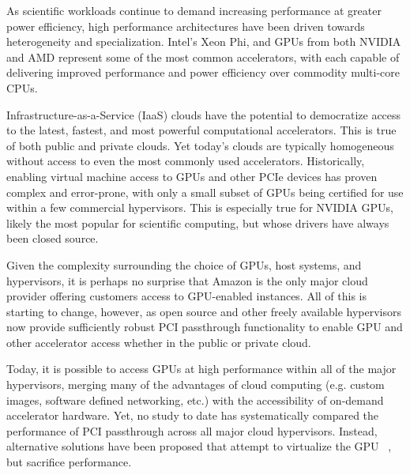 

As scientific workloads continue to demand increasing performance at greater
power efficiency, high performance architectures have been driven towards heterogeneity and
specialization.  Intel's Xeon Phi, and GPUs from both NVIDIA and AMD represent some
of the most common accelerators, with each capable of delivering improved
performance and power efficiency over commodity multi-core CPUs. 




 Infrastructure-as-a-Service (IaaS) clouds have the potential to
democratize access to the latest, fastest, and most powerful computational
accelerators.  This is true of both public and private clouds.  Yet today's
clouds are typically homogeneous without access to even the most commonly used
accelerators.  Historically, enabling virtual machine access to GPUs and other PCIe devices has
proven complex and error-prone, with only a small subset of GPUs being
certified for use within a few commercial hypervisors.  This is especially true
for NVIDIA GPUs, likely the most popular for scientific computing, but whose
drivers have always been closed source.  

Given the complexity surrounding the choice of GPUs, host systems, and
hypervisors, it is perhaps no surprise that Amazon is the only major cloud
provider offering customers access to GPU-enabled instances.  All of this is
starting to change, however, as open source and other freely available
hypervisors now provide sufficiently robust PCI passthrough functionality to
enable GPU and other accelerator access whether in the public or private cloud.

Today, it is possible to access GPUs at high performance within all of
the major hypervisors, merging many of the advantages of cloud computing (e.g. custom
images, software defined networking, etc.)  with
the accessibility of on-demand accelerator hardware.  Yet, no study to date has
systematically compared the performance of PCI passthrough across all major
cloud hypervisors.  Instead, alternative solutions have been proposed that
attempt to virtualize the GPU~\cite{Duato2010rc}
, but sacrifice performance.


